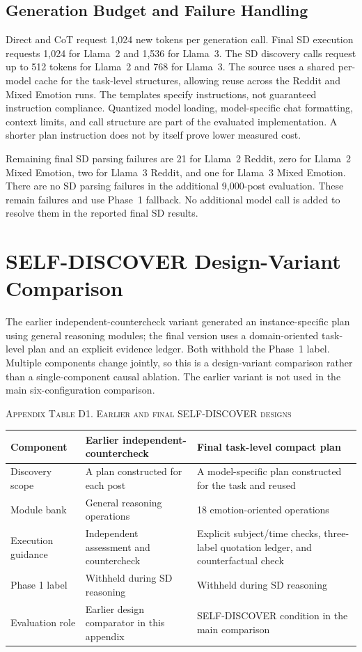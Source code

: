 \documentclass{ieeeaccess}
\begin{document}
\subsection{Generation Budget and Failure Handling}
Direct and CoT request 1,024 new tokens per generation call. Final SD execution requests 1,024 for Llama~2 and 1,536 for Llama~3. The SD discovery calls request up to 512 tokens for Llama~2 and 768 for Llama~3. The source uses a shared per-model cache for the task-level structures, allowing reuse across the Reddit and Mixed Emotion runs. The templates specify instructions, not guaranteed instruction compliance. Quantized model loading, model-specific chat formatting, context limits, and call structure are part of the evaluated implementation. A shorter plan instruction does not by itself prove lower measured cost.

Remaining final SD parsing failures are 21 for Llama~2 Reddit, zero for Llama~2 Mixed Emotion, two for Llama~3 Reddit, and one for Llama~3 Mixed Emotion. There are no SD parsing failures in the additional 9,000-post evaluation. These remain failures and use Phase~1 fallback. No additional model call is added to resolve them in the reported final SD results.
\section{SELF-DISCOVER Design-Variant Comparison}\label{app:sd-variants}
The earlier independent-countercheck variant generated an instance-specific plan using general reasoning modules; the final version uses a domain-oriented task-level plan and an explicit evidence ledger. Both withhold the Phase~1 label. Multiple components change jointly, so this is a design-variant comparison rather than a single-component causal ablation. The earlier variant is not used in the main six-configuration comparison.

\par\medskip\noindent\textsc{Appendix Table D1. Earlier and final SELF-DISCOVER designs}\par\smallskip
{\small\renewcommand{\arraystretch}{1.18}
\noindent\begin{tabularx}{\textwidth}{@{}p{}YY@{}}\toprule
Component & Earlier independent-countercheck & Final task-level compact plan \\\midrule
Discovery scope & A plan constructed for each post & A model-specific plan constructed for the task and reused \\
Module bank & General reasoning operations & 18 emotion-oriented operations \\
Execution guidance & Independent assessment and countercheck & Explicit subject/time checks, three-label quotation ledger, and counterfactual check \\
Phase 1 label & Withheld during SD reasoning & Withheld during SD reasoning \\
Evaluation role & Earlier design comparator in this appendix & SELF-DISCOVER condition in the main comparison \\\bottomrule
\end{tabularx}}\par\medskip
\end{document}
